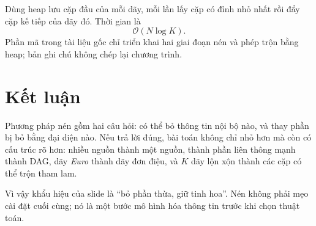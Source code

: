 \documentclass[11pt]{article}
\newcommand{\Oh}{\mathcal{O}}
\begin{document}
Dùng heap lưu cặp đầu của mỗi dãy, mỗi lần lấy cặp có đỉnh nhỏ nhất rồi đẩy
cặp kế tiếp của dãy đó. Thời gian là
\[
  \Oh(N\log K).
\]
Phần mã trong tài liệu gốc chỉ triển khai hai giai đoạn nén và phép trộn bằng
heap; bản ghi chú không chép lại chương trình.

\section{Kết luận}

Phương pháp nén gồm hai câu hỏi: có thể bỏ thông tin nội bộ nào, và thay phần
bị bỏ bằng đại diện nào. Nếu trả lời đúng, bài toán không chỉ nhỏ hơn mà còn
có cấu trúc rõ hơn: nhiều nguồn thành một nguồn, thành phần liên thông mạnh
thành DAG, dãy \textit{Euro} thành dãy đơn điệu, và \(K\) dãy lộn xộn thành
các cặp có thể trộn tham lam.

Vì vậy khẩu hiệu của slide là ``bỏ phần thừa, giữ tinh hoa''. Nén không phải
mẹo cài đặt cuối cùng; nó là một bước mô hình hóa thông tin trước khi chọn
thuật toán.
\end{document}
